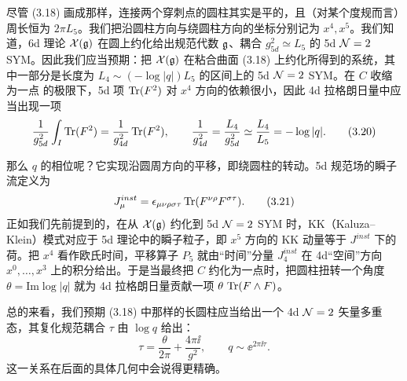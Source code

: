  尽管 (3.18) 画成那样，连接两个穿刺点的圆柱其实是平的，且（对某个度规而言）周长恒为 $2\pi L_5$。我们把沿圆柱方向与绕圆柱方向的坐标分别记为 $x^4,x^5$。我们知道，6d 理论 $\mathcal{X}(\mathfrak{g})$ 在圆上约化给出规范代数 $\mathfrak{g}$、耦合 $g_{5d}^2\simeq L_5$ 的 5d $\mathcal{N}=2$ SYM。因此我们应当预期：把 $\mathcal{X}(\mathfrak{g})$ 在粘合曲面 (3.18) 上约化所得到的系统，其中一部分是长度为 $L_4\sim(-\log|q|)L_5$ 的区间上的 5d $\mathcal{N}=2$ SYM。在 $C$ 收缩为一点
的极限下，5d 项 $\operatorname{Tr}(F^2)$ 对 $x^4$ 方向的依赖很小，因此 4d 拉格朗日量中应当出现一项
\begin{equation}
  \frac{1}{g_{5d}^2}\int_I \operatorname{Tr}(F^2)=\frac{1}{g_{4d}^2}\operatorname{Tr}(F^2),
  \qquad
  \frac{1}{g_{4d}^2}=\frac{L_4}{g_{5d}^2}\simeq\frac{L_4}{L_5}=-\log|q|.
  \tag{3.20}
\end{equation}


那么 $q$ 的相位呢？它实现沿圆周方向的平移，即绕圆柱的转动。5d 规范场的瞬子流定义为
\begin{equation}
  J^{inst}_\mu=\epsilon_{\mu\nu\rho\sigma\tau}\operatorname{Tr}(F^{\nu\rho}F^{\sigma\tau}).
  \tag{3.21}
\end{equation}
正如我们先前提到的，在从 $\mathcal{X}(\mathfrak{g})$ 约化到 5d $\mathcal{N}=2$ SYM 时，KK（Kaluza--Klein）模式对应于 5d 理论中的瞬子粒子，即 $x^5$ 方向的 KK 动量等于 $J^{inst}$ 下的荷。把 $x^4$ 看作欧氏时间，平移算子 $P_5$ 就由“时间”分量 $J^{inst}_4$ 在 4d“空间”方向 $x^0,\dots,x^3$ 上的积分给出。于是当最终把 $C$ 约化为一点时，把圆柱扭转一个角度 $\theta=\mathrm{Im}\log|q|$ 就为 4d 拉格朗日量贡献一项 $\theta\,\operatorname{Tr}(F\wedge F)$。


总的来看，我们预期 (3.18) 中那样的长圆柱应当给出一个 4d $\mathcal{N}=2$ 矢量多重态，其复化规范耦合 $\tau$ 由 $\log q$ 给出：
\begin{equation}
  \tau=\frac{\theta}{2\pi}+\frac{4\pi\ii}{g^2},
  \qquad
  q\sim \ee^{2\pi\ii\tau}.
  \tag{3.22}
\end{equation}
这一关系在后面的具体几何中会说得更精确。

